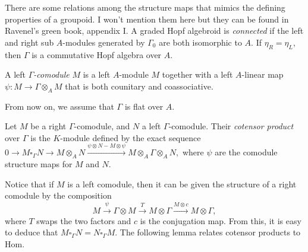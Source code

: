 There are some relations among the structure maps that mimics the defining properties of a groupoid.  I won't mention them here but they can be found in Ravenel's green book, appendix I.  A graded Hopf algebroid is \textit{connected} if the left and right sub $ A$-modules generated by $ \Gamma_0$ are both isomorphic to $ A$.  If $ \eta_R = \eta_L$, then $ \Gamma$ is a commutative Hopf algebra over $ A$.

\begin{definition}
A left \textit{$ \Gamma$-comodule} $ M$ is a left $ A$-module $ M$ together with a left $ A$-linear map $ \psi: M \to \Gamma \otimes_A M$ that is both counitary and coassociative.
\end{definition}

From now on, we assume that $ \Gamma$ is flat over $ A$.

\begin{definition}
Let $ M$ be a right $ \Gamma$-comodule, and $ N$ a left $ \Gamma$-comodule.  Their \textit{cotensor product} over $ \Gamma$ is the $ K$-module defined by the exact sequence
$ \displaystyle 0 \rightarrow M \square_{\Gamma} N \rightarrow M \otimes_A N \stackrel{\psi \otimes N - M \otimes \psi}{\longrightarrow} M \otimes_A \Gamma \otimes_A N,$
where $\psi$ are the comodule structure maps for $ M$ and $ N$.
\end{definition}

Notice that if $ M$ is a left comodule, then it can be given the structure of a right comodule by the composition
$$ M \stackrel{\psi}{\longrightarrow} \Gamma \otimes M \stackrel{T}{\longrightarrow} M \otimes \Gamma \stackrel{M \otimes c}{\longrightarrow} M \otimes \Gamma,$$
where $ T$ swaps the two factors and $ c$ is the conjugation map.  From this, it is easy to deduce that $ M \square_{\Gamma}N = N \square_{\Gamma} M$.  The following lemma relates cotensor products to Hom.

